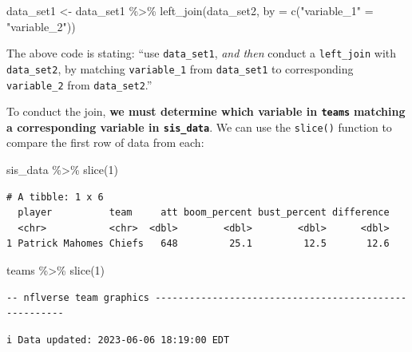 \documentclass[
  letterpaper,
]{krantz}
\newenvironment{Shaded}{\begin{snugshade}}{\end{snugshade}}
\newcommand{\AttributeTok}[1]{\textcolor[rgb]{0.40,0.45,0.13}{#1}}
\newcommand{\DecValTok}[1]{\textcolor[rgb]{0.68,0.00,0.00}{#1}}
\newcommand{\FunctionTok}[1]{\textcolor[rgb]{0.28,0.35,0.67}{#1}}
\newcommand{\NormalTok}[1]{\textcolor[rgb]{0.00,0.23,0.31}{#1}}
\newcommand{\OtherTok}[1]{\textcolor[rgb]{0.00,0.23,0.31}{#1}}
\newcommand{\SpecialCharTok}[1]{\textcolor[rgb]{0.37,0.37,0.37}{#1}}
\newcommand{\StringTok}[1]{\textcolor[rgb]{0.13,0.47,0.30}{#1}}
\begin{document}
\begin{Shaded}
\begin{Highlighting}[]
\NormalTok{data\_set1 }\OtherTok{\textless{}{-}}\NormalTok{ data\_set1 }\SpecialCharTok{\%\textgreater{}\%}
  \FunctionTok{left\_join}\NormalTok{(data\_set2, }\AttributeTok{by =} \FunctionTok{c}\NormalTok{(}\StringTok{"variable\_1"} \OtherTok{=} \StringTok{"variable\_2"}\NormalTok{))}
\end{Highlighting}
\end{Shaded}

The above code is stating: ``use \texttt{data\_set1}, \emph{and then}
conduct a \texttt{left\_join} with \texttt{data\_set2}, by matching
\texttt{variable\_1} from \texttt{data\_set1} to corresponding
\texttt{variable\_2} from \texttt{data\_set2}.''

To conduct the join, \textbf{we must determine which variable in
\texttt{teams}} \textbf{matching a corresponding variable in
\texttt{sis\_data}}. We can use the \texttt{slice()} function to compare
the first row of data from each:

\begin{Shaded}
\begin{Highlighting}[]
\NormalTok{sis\_data }\SpecialCharTok{\%\textgreater{}\%}
  \FunctionTok{slice}\NormalTok{(}\DecValTok{1}\NormalTok{)}
\end{Highlighting}
\end{Shaded}

\begin{verbatim}
# A tibble: 1 x 6
  player          team     att boom_percent bust_percent difference
  <chr>           <chr>  <dbl>        <dbl>        <dbl>      <dbl>
1 Patrick Mahomes Chiefs   648         25.1         12.5       12.6
\end{verbatim}

\begin{Shaded}
\begin{Highlighting}[]
\NormalTok{teams }\SpecialCharTok{\%\textgreater{}\%}
  \FunctionTok{slice}\NormalTok{(}\DecValTok{1}\NormalTok{)}
\end{Highlighting}
\end{Shaded}

\begin{verbatim}
-- nflverse team graphics ------------------------------------------------------
\end{verbatim}

\begin{verbatim}
i Data updated: 2023-06-06 18:19:00 EDT
\end{verbatim}
\end{document}
